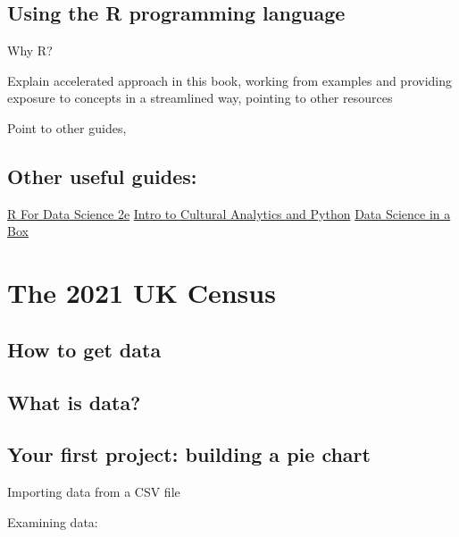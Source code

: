 \documentclass[
  letterpaper,
  DIV=11,
  numbers=noendperiod]{scrreprt}
\begin{document}
\hypertarget{using-the-r-programming-language}{%
\section{Using the R programming
language}\label{using-the-r-programming-language}}

Why R?

Explain accelerated approach in this book, working from examples and
providing exposure to concepts in a streamlined way, pointing to other
resources

Point to other guides,

\hypertarget{other-useful-guides}{%
\section{Other useful guides:}\label{other-useful-guides}}

\href{https://r4ds.hadley.nz/}{R For Data Science 2e}
\href{https://melaniewalsh.github.io/Intro-Cultural-Analytics/welcome.html}{Intro
to Cultural Analytics and Python}
\href{https://datasciencebox.org/01-overview}{Data Science in a Box}


\hypertarget{the-2021-uk-census}{%
\chapter{The 2021 UK Census}\label{the-2021-uk-census}}

\hypertarget{how-to-get-data}{%
\section{How to get data}\label{how-to-get-data}}

\hypertarget{what-is-data}{%
\section{What is data?}\label{what-is-data}}

\hypertarget{your-first-project-building-a-pie-chart}{%
\section{Your first project: building a pie
chart}\label{your-first-project-building-a-pie-chart}}

Importing data from a CSV file

Examining data:
\end{document}
